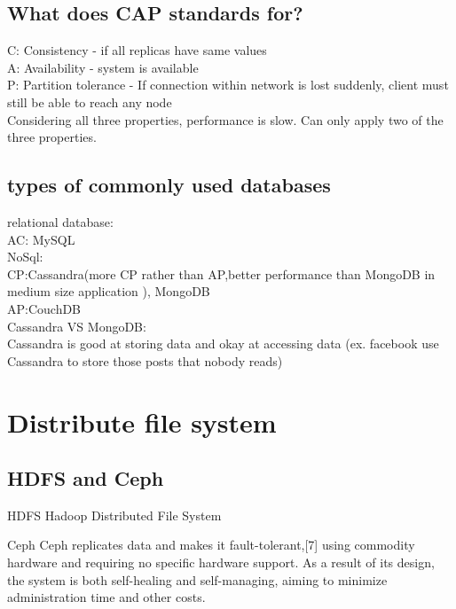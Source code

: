 \documentclass[fancy,11pt,titlestyle=display]{style/elegantbook}
\begin{document}
\section{What does CAP standards for?}

C: Consistency - if all replicas have same values\\
A: Availability - system is available\\
P: Partition tolerance - If connection within network is lost suddenly, client must still be able to reach any node\\

Considering all three properties, performance is slow.
Can only apply two of the three properties.

\section{types of commonly used databases}

relational database:\\
AC: MySQL\\

NoSql:\\
CP:Cassandra(more CP rather than AP,better performance than MongoDB in medium size application ), MongoDB\\
AP:CouchDB\\

Cassandra VS MongoDB:\\
Cassandra is good at storing data and okay at accessing data (ex. facebook use Cassandra to store those posts that nobody reads)

\chapter{Distribute file system}

\section{HDFS and Ceph}
\begin{definition}{HDFS}{}
Hadoop Distributed File System
\end{definition}
\begin{definition}{Ceph}{}
Ceph replicates data and makes it fault-tolerant,[7] using commodity hardware and requiring no specific hardware support. As a result of its design, the system is both self-healing and self-managing, aiming to minimize administration time and other costs.
\end{definition}
\end{document}
